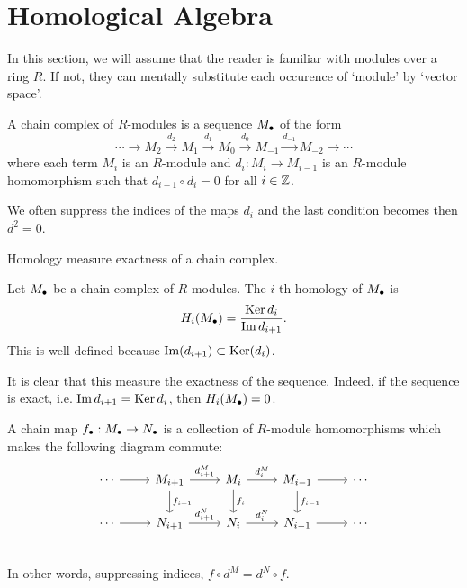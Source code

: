 \section*{Homological Algebra}
In this section, we will assume that the reader is familiar with modules over a ring $R$. If not, they can mentally substitute each occurence of `module' by `vector space'.

\begin{definition}
    A chain complex of $R$-modules is a sequence $M_\bullet$ of the form
    \[
    \cdots \to  M_2 \xrightarrow{d_2}  M_1 \xrightarrow{d_1} M_0 \xrightarrow{d_0} M_{-1} \xrightarrow{d_{-1}}   M_{-2} \to  \cdots
    \] 
    where each term $M_i$ is an $R$-module and $d_i: M_i \to  M_{i-1}$ is an $R$-module homomorphism such that $d_{i-1}  \circ  d_i = 0$  for all $i \in \mathbb{Z}$.
\end{definition}
We often suppress the indices of the maps $d_i$ and the last condition becomes then  $d^2 = 0$.

\begin{marginfigure}
    \centering
    \caption{Homology measure exactness of a chain complex.}
    \label{fig:homology-definition}
\end{marginfigure}

\begin{definition}[Homology]
    Let $M_\bullet$ be a chain complex of  $R$-modules. The $i$-th homology of $M_\bullet$ is
     \[
         H_i(M_\bullet) = \frac{\operatorname{Ker} d_i}{\operatorname{Im} d_{i+1}}
    .\] 
    This is well defined because $\operatorname{Im}(d_{i+1}) \subset \operatorname{Ker} (d_i)$.
\end{definition}
It is clear that this measure the exactness of the sequence. Indeed, if the sequence is exact, i.e. $\operatorname{Im} d_{i+1} = \operatorname{Ker} d_i$, then $H_i(M_\bullet) = 0$.


\begin{definition}
    A chain map $f_\bullet: M_\bullet \to  N_\bullet$ is a collection of $R$-module homomorphisms which makes the following diagram commute:
    \[
        \begin{tikzcd}
            \cdots  \arrow[r, ""]&
            M_{i+1} \arrow[r, "d_{i+1}^{M}"] \arrow[d, "f_{i+1}"]&
            M_{i} \arrow[r, "d_{i}^{M}"] \arrow[d, "f_i"]&
            M_{i-1} \arrow[r, ""] \arrow[d, "f_{i-1}"]&
            \cdots \\
            \cdots  \arrow[r, ""]&
            N_{i+1} \arrow[r, "d_{i+1}^{N}"] &
            N_{i} \arrow[r, "d_{i}^{N}"] &
            N_{i-1} \arrow[r, ""] &
            \cdots \\
        \end{tikzcd}
    \]
    In other words, suppressing indices, $f  \circ  d^{M} = d^{N}  \circ f$.
\end{definition}

